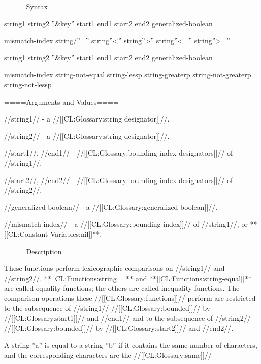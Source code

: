 
====Syntax====

 {string1 string2 ''&key'' start1 end1 start2 end2} {generalized-boolean}

 {mismatch-index} {string/''='' string''<'' string''>'' string''<='' string''>=''}

 {string1 string2 ''&key'' start1 end1 start2 end2} {generalized-boolean}

 {mismatch-index} {string-not-equal string-lessp string-greaterp string-not-greaterp string-not-lessp}

====Arguments and Values====

//string1// - a //[[CL:Glossary:string designator]]//.

//string2// - a //[[CL:Glossary:string designator]]//.

//start1//, //end1// - //[[CL:Glossary:bounding index designators]]// of //string1//. 

//start2//, //end2// - //[[CL:Glossary:bounding index designators]]// of //string2//. 

//generalized-boolean// - a //[[CL:Glossary:generalized boolean]]//.

//mismatch-index// - a //[[CL:Glossary:bounding index]]// of //string1//, or **[[CL:Constant Variables:nil]]**.

====Description====

These functions perform lexicographic comparisons on //string1// and //string2//. **[[CL:Functions:string=]]** and **[[CL:Functions:string-equal]]** are called equality functions; the others are called inequality functions. The comparison operations these //[[CL:Glossary:functions]]// perform are restricted to the subsequence of //string1// //[[CL:Glossary:bounded]]// by //[[CL:Glossary:start1]]// and //end1// and to the subsequence of //string2// //[[CL:Glossary:bounded]]// by //[[CL:Glossary:start2]]// and //end2//.

A string ''a'' is equal to a string ''b'' if it contains the same number of characters, and the corresponding characters are the //[[CL:Glossary:same]]//

